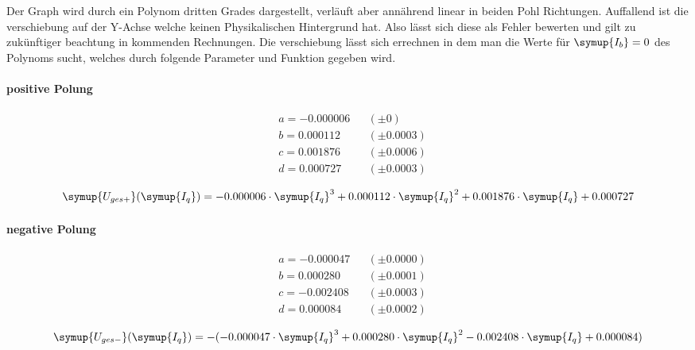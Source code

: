 Der Graph wird durch ein Polynom dritten Grades dargestellt, verläuft aber annährend linear in beiden Pohl Richtungen. Auffallend ist die verschiebung auf der Y-Achse %
welche keinen Physikalischen Hintergrund hat. Also lässt sich diese als Fehler bewerten und gilt zu zukünftiger beachtung in kommenden Rechnungen.
Die verschiebung lässt sich errechnen in dem man die Werte für $\symup{I_b}=0$ des Polynoms sucht, welches durch folgende Parameter und Funktion gegeben wird.
\paragraph{positive Polung}

\begin{align*}
   &a = -0.000006 &&(\pm 0) \\
   &b = 0.000112 &&(\pm 0.0003)\\
   &c = 0.001876 &&(\pm 0.0006) \\
   &d = 0.000727 &&(\pm 0.0003) 
\end{align*}

\begin{equation}
   \symup{U_{ges+}}(\symup{I_q})=-0.000006 \cdot \symup{I_q}^3 + 0.000112\cdot\symup{I_q}^2 + 0.001876 \cdot\symup{I_q} + 0.000727 
\end{equation}

\paragraph{negative Polung} 

\begin{align*}
   &a = -0.000047 &&(\pm 0.0000) \\
   &b = 0.000280 &&(\pm 0.0001 ) \\
   &c = -0.002408 &&(\pm 0.0003) \\
   &d = 0.000084 &&(\pm 0.0002 ) 
\end{align*}
 
\begin{equation}
   \symup{U_{ges-}}(\symup{I_q})=-(-0.000047 \cdot \symup{I_q}^3 + 0.000280\cdot\symup{I_q}^2 -0.002408\cdot\symup{I_q} + 0.000084)
\end{equation}

%
%









